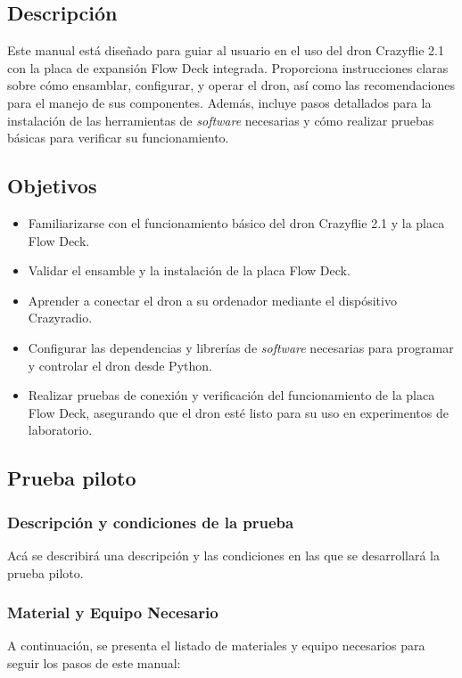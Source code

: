 \subsection{Descripción}
Este manual está diseñado para guiar al usuario en el uso del dron Crazyflie 2.1 con la placa de expansión Flow Deck integrada. Proporciona instrucciones claras sobre cómo ensamblar, configurar, y operar el dron, así como las recomendaciones para el manejo de sus componentes. Además, incluye pasos detallados para la instalación de las herramientas de \textit{software} necesarias y cómo realizar pruebas básicas para verificar su funcionamiento.

\subsection{Objetivos}
\begin{itemize}
	\item Familiarizarse con el funcionamiento básico del dron Crazyflie 2.1 y la placa Flow Deck.
	\item Validar el ensamble y la instalación de la placa Flow Deck.
	\item Aprender a conectar el dron a su ordenador mediante el dispósitivo Crazyradio.
	\item Configurar las dependencias y librerías de \textit{software} necesarias para programar y controlar el dron desde Python.
	\item Realizar pruebas de conexión y verificación del funcionamiento de la placa Flow Deck, asegurando que el dron esté listo para su uso en experimentos de laboratorio.
\end{itemize}

\subsection{Prueba piloto}
\subsubsection{Descripción y condiciones de la prueba}
Acá se describirá una descripción y las condiciones en las que se desarrollará la prueba piloto.

\subsubsection{Material y Equipo Necesario}
A continuación, se presenta el listado de materiales y equipo necesarios para seguir los pasos de este manual:

